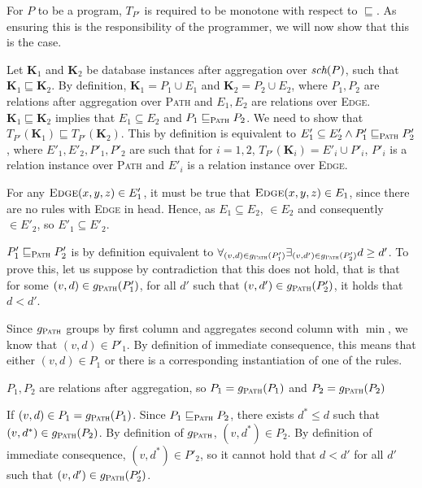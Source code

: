 \begin{exmp}
For $P$ to be a \datalogra program, $T_{P'}$ is required to be monotone with respect to $\sqsubseteq$. As ensuring this is the responsibility of the programmer, we will now show that this is the case.

\begin{prof}
Let \textbf{K}$_1$ and \textbf{K}$_2$ be database instances after aggregation over $\textit{sch}(P)$, such that $\textbf{K}_1 \sqsubseteq \textbf{K}_2$. By definition, $\textbf{K}_1 = P_1 \cup E_1$ and $\textbf{K}_2 = P_2 \cup E_2$, where $P_1, P_2$ are relations after aggregation over \textsc{Path} and $E_1, E_2$ are relations over \textsc{Edge}.  $\textbf{K}_1 \sqsubseteq \textbf{K}_2$ implies that $E_1 \subseteq E_2$ and $P_1 \sqsubseteq_\textsc{Path} P_2$. We need to show that $T_{P'}(\textbf{K}_1) \sqsubseteq T_{P'}(\textbf{K}_2)$. This by definition is equivalent to $E'_1 \subseteq E'_2 \wedge P'_1 \sqsubseteq_\textsc{Path} P'_2$, where $E'_1, E'_2, P'_1, P'_2$ are such that for $i = 1, 2$, $T_{P'}(\textbf{K}_i) = E'_i \cup P'_i$, $P'_i$ is a relation instance over \textsc{Path} and $E'_i$ is a relation instance over \textsc{Edge}.

For any $\textsc{Edge}{(x, y, z)} \in E'_1$, it must be true that $\textsc{Edge}{(x, y, z)} \in E_1$, since there are no rules with \textsc{Edge} in head. Hence, as $E_1 \subseteq E_2$, $ \in E_2$ and consequently $ \in E'_2$, so $E'_1 \subseteq E'_2$.

$P'_1 \sqsubseteq_\textsc{Path} P'_2$ is by definition equivalent to $\forall_{(v, d) \in g_\textsc{Path}(P'_1)} \exists_{(v, d') \in g_\textsc{Path}(P'_2)} d \ge d' $.  To prove this, let us suppose by contradiction that this does not hold, that is that for some $(v, d) \in g_\textsc{Path}(P'_1)$, for all $d'$ such that $(v, d') \in g_\textsc{Path}(P'_2)$, it holds that $d < d'$.

Since $g_\textsc{Path}$ groups by first column and aggregates second column with $\min$, we know that $(v, d) \in P'_1$. By definition of immediate consequence, this means that either $(v, d) \in P_1$ or there is a corresponding instantiation of one of the rules.

$P_1, P_2$ are relations after aggregation, so $P_1 = g_\textsc{Path}(P_1)$ and $P_2 = g_\textsc{Path}(P_2)$

If $(v, d) \in P_1 = g_\textsc{Path}(P_1)$. Since $P_1 \sqsubseteq_\textsc{Path} P_2$, there exists $d^* \le d$ such that $(v, d^*) \in g_\textsc{Path}(P_2)$. By definition of $g_\textsc{Path}$, $(v, d^*) \in P_2$. By definition of immediate consequence, $(v, d^*) \in P'_2$, so it cannot hold that $d < d'$ for all $d'$ such that $(v, d') \in g_\textsc{Path}(P'_2)$.


\end{prof}
\end{exmp}
